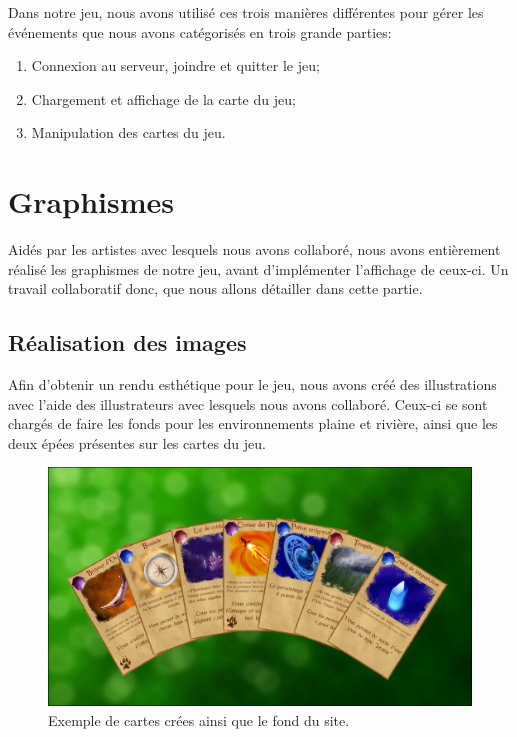 \documentclass[12pt]{report}
\begin{document}
	Dans notre jeu, nous avons utilisé ces trois manières différentes pour gérer les événements que nous avons catégorisés en trois grande parties:
	\begin{enumerate}
		\item{Connexion au serveur, joindre et quitter le jeu;}
		\item{Chargement et affichage de la carte du jeu;}
		\item{Manipulation des cartes du jeu.}
	\end{enumerate}

  \section{Graphismes}
	Aidés par les artistes avec lesquels nous avons collaboré, nous avons entièrement réalisé les graphismes de notre jeu, avant d'implémenter l'affichage de ceux-ci. Un travail collaboratif donc, que nous allons détailler dans cette partie.

    \subsection{Réalisation des images}
		Afin d'obtenir un rendu esthétique pour le jeu, nous avons créé des illustrations avec l'aide des illustrateurs avec lesquels nous avons collaboré. Ceux-ci se sont chargés de faire les fonds pour les environnements plaine et rivière, ainsi que les deux épées présentes sur les cartes du jeu.

    \begin{figure}[h!]
     	\centering
       	\includegraphics[scale=0.45]{cards.png}
       	\caption{Exemple de cartes crées ainsi que le fond du site.}
       	\label{fig:cartes}
    \end{figure}
\end{document}
